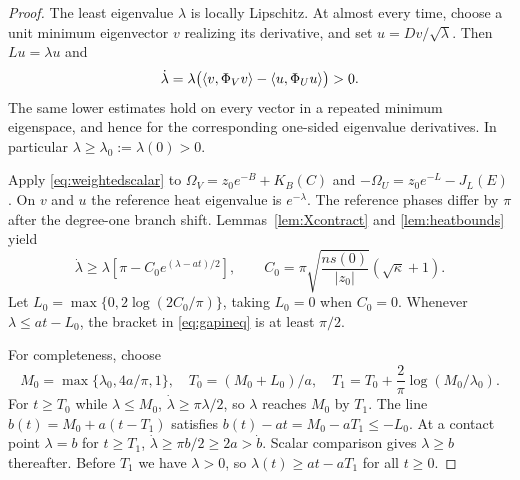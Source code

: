 \begin{proof}
The least eigenvalue $\lambda$ is locally Lipschitz. At almost every
time, choose a unit minimum eigenvector $v$ realizing its derivative,
and set $u=Dv/\sqrt\lambda$. Then $Lu=\lambda u$ and
\begin{equation}\label{eq:lambdaderivative}
 \dot\lambda
 =\lambda\bigl(\left\langle v,\Phi_Vv\right\rangle-\left\langle u,\Phi_Uu\right\rangle\bigr)>0.
\end{equation}
The same lower estimates hold on every vector in a repeated minimum
eigenspace, and hence for the corresponding one-sided eigenvalue
derivatives. In particular $\lambda\geq\lambda_0:=\lambda(0)>0$.

Apply \eqref{eq:weightedscalar} to
$\Omega_V=z_0e^{-B}+K_B(C)$ and
$-\Omega_U=z_0e^{-L}-J_L(E)$.
On $v$ and $u$ the reference heat eigenvalue is $e^{-\lambda}$.
The reference phases differ by $\pi$ after the degree-one branch
shift. Lemmas~\ref{lem:Xcontract} and \ref{lem:heatbounds} yield
\begin{equation}\label{eq:gapineq}
 \dot\lambda\geq\lambda
   \left[\pi-C_0e^{(\lambda-at)/2}\right],\qquad
 C_0=\pi\sqrt{\frac{ns(0)}{|z_0|}}(\sqrt\kappa+1).
\end{equation}
Let $L_0=\max\{0,2\log(2C_0/\pi)\}$, taking $L_0=0$ when $C_0=0$.
Whenever $\lambda\leq at-L_0$, the bracket in \eqref{eq:gapineq}
is at least $\pi/2$.

For completeness, choose
\[
 M_0=\max\{\lambda_0,4a/\pi,1\},\quad
 T_0=(M_0+L_0)/a,\quad
 T_1=T_0+\frac2\pi\log(M_0/\lambda_0).
\]
For $t\geq T_0$ while $\lambda\leq M_0$,
$\dot\lambda\geq\pi\lambda/2$, so $\lambda$ reaches $M_0$ by $T_1$.
The line $b(t)=M_0+a(t-T_1)$ satisfies
$b(t)-at=M_0-aT_1\leq-L_0$.
At a contact point $\lambda=b$ for $t\geq T_1$,
$\dot\lambda\geq\pi b/2\geq2a>\dot b$.
Scalar comparison gives $\lambda\geq b$ thereafter. Before $T_1$
we have $\lambda>0$, so $\lambda(t)\geq at-aT_1$ for all $t\geq0$.
\end{proof}

